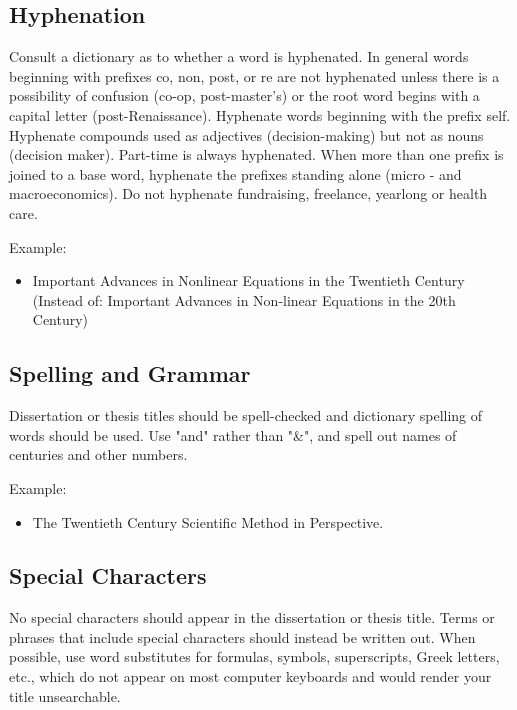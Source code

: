 \subsection{Hyphenation}

Consult a dictionary as to whether a word is hyphenated. In general words beginning with prefixes co, non, post, or re are not hyphenated unless there is a possibility of confusion (co-op, post-master's) or the root word begins with a capital letter (post-Renaissance). Hyphenate words beginning with the prefix self. Hyphenate compounds used as adjectives (decision-making) but not as nouns (decision maker). Part-time is always hyphenated. When more than one prefix is joined to a base word, hyphenate the prefixes standing alone (micro - and macroeconomics). Do not hyphenate fundraising, freelance, yearlong or health care.

Example:

\begin{itemize}
\item Important Advances in Nonlinear Equations in the Twentieth Century (Instead of: Important Advances in Non-linear Equations in the 20th Century)

\end{itemize}

\subsection{Spelling and Grammar}

Dissertation or thesis titles should be spell-checked and dictionary spelling of words should be used.  Use "and" rather than "\&", and spell out names of centuries and other numbers.

Example:

\begin{itemize}
\item The Twentieth Century Scientific Method in Perspective.

\end{itemize}

\subsection{Special Characters}

No special characters should appear in the dissertation or thesis title.  Terms or phrases that include special characters should instead be written out.  When possible, use word substitutes for formulas, symbols, superscripts, Greek letters, etc., which do not appear on most computer keyboards and would render your title unsearchable.

